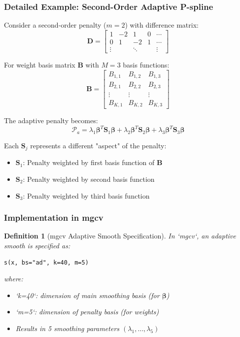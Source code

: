 \documentclass[12pt]{article}
\newtheorem{definition}{Definition}
\begin{document}
\subsubsection{Detailed Example: Second-Order Adaptive P-spline}

Consider a second-order penalty ($m=2$) with difference matrix:
\begin{equation}
\mathbf{D} = \begin{bmatrix}
1 & -2 & 1 & 0 & \cdots \\
0 & 1 & -2 & 1 & \cdots \\
\vdots & & \ddots & & \vdots
\end{bmatrix}
\end{equation}

For weight basis matrix $\mathbf{B}$ with $M=3$ basis functions:
\begin{equation}
\mathbf{B} = \begin{bmatrix}
B_{1,1} & B_{1,2} & B_{1,3} \\
B_{2,1} & B_{2,2} & B_{2,3} \\
\vdots & \vdots & \vdots \\
B_{K,1} & B_{K,2} & B_{K,3}
\end{bmatrix}
\end{equation}

The adaptive penalty becomes:
\begin{equation}
\mathcal{P}_a = \lambda_1 \boldsymbol{\beta}^T \mathbf{S}_1 \boldsymbol{\beta} + \lambda_2 \boldsymbol{\beta}^T \mathbf{S}_2 \boldsymbol{\beta} + \lambda_3 \boldsymbol{\beta}^T \mathbf{S}_3 \boldsymbol{\beta}
\end{equation}

Each $\mathbf{S}_j$ represents a different "aspect" of the penalty:
\begin{itemize}
    \item $\mathbf{S}_1$: Penalty weighted by first basis function of $\mathbf{B}$
    \item $\mathbf{S}_2$: Penalty weighted by second basis function
    \item $\mathbf{S}_3$: Penalty weighted by third basis function
\end{itemize}

\subsubsection{Implementation in mgcv}

\begin{definition}[mgcv Adaptive Smooth Specification]
In `mgcv`, an adaptive smooth is specified as:
\begin{verbatim}
s(x, bs="ad", k=40, m=5)
\end{verbatim}
where:
\begin{itemize}
    \item `k=40`: dimension of main smoothing basis (for $\boldsymbol{\beta}$)
    \item `m=5`: dimension of penalty basis (for weights)
    \item Results in 5 smoothing parameters $(\lambda_1, \ldots, \lambda_5)$
\end{itemize}
\end{definition}
\end{document}
